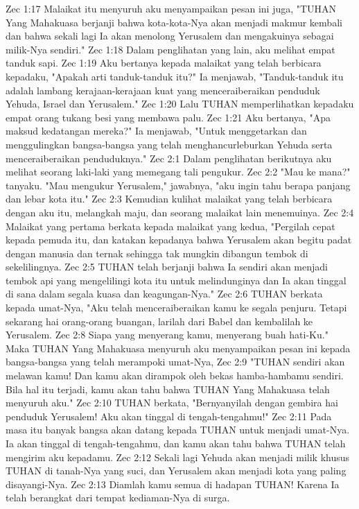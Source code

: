 Zec 1:17  Malaikat itu menyuruh aku menyampaikan pesan ini juga, "TUHAN Yang Mahakuasa berjanji bahwa kota-kota-Nya akan menjadi makmur kembali dan bahwa sekali lagi Ia akan menolong Yerusalem dan mengakuinya sebagai milik-Nya sendiri."
Zec 1:18  Dalam penglihatan yang lain, aku melihat empat tanduk sapi.
Zec 1:19  Aku bertanya kepada malaikat yang telah berbicara kepadaku, "Apakah arti tanduk-tanduk itu?" Ia menjawab, "Tanduk-tanduk itu adalah lambang kerajaan-kerajaan kuat yang menceraiberaikan penduduk Yehuda, Israel dan Yerusalem."
Zec 1:20  Lalu TUHAN memperlihatkan kepadaku empat orang tukang besi yang membawa palu.
Zec 1:21  Aku bertanya, "Apa maksud kedatangan mereka?" Ia menjawab, "Untuk menggetarkan dan menggulingkan bangsa-bangsa yang telah menghancurleburkan Yehuda serta menceraiberaikan penduduknya."
Zec 2:1  Dalam penglihatan berikutnya aku melihat seorang laki-laki yang memegang tali pengukur.
Zec 2:2  "Mau ke mana?" tanyaku. "Mau mengukur Yerusalem," jawabnya, "aku ingin tahu berapa panjang dan lebar kota itu."
Zec 2:3  Kemudian kulihat malaikat yang telah berbicara dengan aku itu, melangkah maju, dan seorang malaikat lain menemuinya.
Zec 2:4  Malaikat yang pertama berkata kepada malaikat yang kedua, "Pergilah cepat kepada pemuda itu, dan katakan kepadanya bahwa Yerusalem akan begitu padat dengan manusia dan ternak sehingga tak mungkin dibangun tembok di sekelilingnya.
Zec 2:5  TUHAN telah berjanji bahwa Ia sendiri akan menjadi tembok api yang mengelilingi kota itu untuk melindunginya dan Ia akan tinggal di sana dalam segala kuasa dan keagungan-Nya."
Zec 2:6  TUHAN berkata kepada umat-Nya, "Aku telah menceraiberaikan kamu ke segala penjuru. Tetapi sekarang hai orang-orang buangan, larilah dari Babel dan kembalilah ke Yerusalem.
Zec 2:8  Siapa yang menyerang kamu, menyerang buah hati-Ku." Maka TUHAN Yang Mahakuasa menyuruh aku menyampaikan pesan ini kepada bangsa-bangsa yang telah merampoki umat-Nya,
Zec 2:9  "TUHAN sendiri akan melawan kamu! Dan kamu akan dirampok oleh bekas hamba-hambamu sendiri. Bila hal itu terjadi, kamu akan tahu bahwa TUHAN Yang Mahakuasa telah menyuruh aku."
Zec 2:10  TUHAN berkata, "Bernyanyilah dengan gembira hai penduduk Yerusalem! Aku akan tinggal di tengah-tengahmu!"
Zec 2:11  Pada masa itu banyak bangsa akan datang kepada TUHAN untuk menjadi umat-Nya. Ia akan tinggal di tengah-tengahmu, dan kamu akan tahu bahwa TUHAN telah mengirim aku kepadamu.
Zec 2:12  Sekali lagi Yehuda akan menjadi milik khusus TUHAN di tanah-Nya yang suci, dan Yerusalem akan menjadi kota yang paling disayangi-Nya.
Zec 2:13  Diamlah kamu semua di hadapan TUHAN! Karena Ia telah berangkat dari tempat kediaman-Nya di surga.
